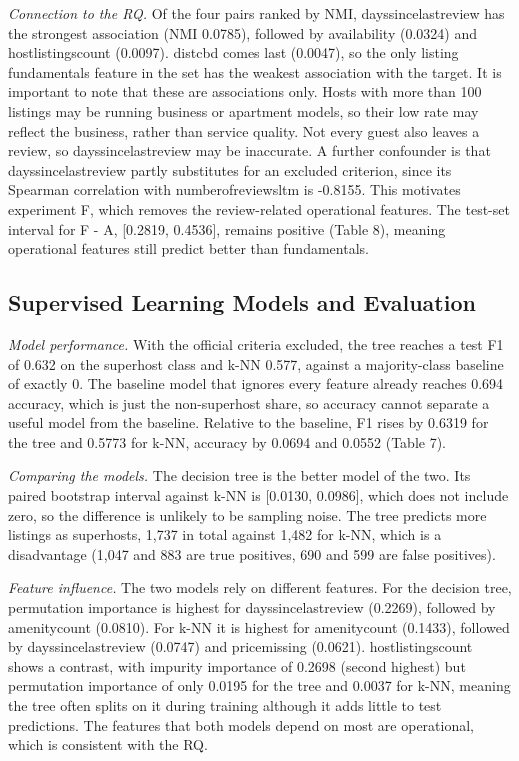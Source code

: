 \documentclass[final,1p,11pt]{elsarticle}
\renewcommand\_{\textunderscore\allowbreak}%
\begin{document}
\textit{Connection to the RQ.} Of the four pairs ranked by NMI, days\_since\_last\_review has the strongest association (NMI 0.0785), followed by availability\_365 (0.0324) and host\_listings\_count (0.0097). dist\_cbd comes last (0.0047), so the only listing fundamentals feature in the set has the weakest association with the target. It is important to note that these are associations only. Hosts with more than 100 listings may be running business or apartment models, so their low rate may reflect the business, rather than service quality. Not every guest also leaves a review, so days\_since\_last\_review may be inaccurate. A further confounder is that days\_since\_last\_review partly substitutes for an excluded criterion, since its Spearman correlation with number\_of\_reviews\_ltm is -0.8155. This motivates experiment F, which removes the review-related operational features. The test-set interval for F - A, [0.2819, 0.4536], remains positive (Table 8), meaning operational features still predict better than fundamentals.

\subsection{Supervised Learning Models and Evaluation}

\textit{Model performance.} With the official criteria excluded, the tree reaches a test F1 of 0.632 on the superhost class and k-NN 0.577, against a majority-class baseline of exactly 0. The baseline model that ignores every feature already reaches 0.694 accuracy, which is just the non-superhost share, so accuracy cannot separate a useful model from the baseline. Relative to the baseline, F1 rises by 0.6319 for the tree and 0.5773 for k-NN, accuracy by 0.0694 and 0.0552 (Table 7).

\textit{Comparing the models.} The decision tree is the better model of the two. Its paired bootstrap interval against k-NN is [0.0130, 0.0986], which does not include zero, so the difference is unlikely to be sampling noise. The tree predicts more listings as superhosts, 1,737 in total against 1,482 for k-NN, which is a disadvantage (1,047 and 883 are true positives, 690 and 599 are false positives).

\textit{Feature influence.} The two models rely on different features. For the decision tree, permutation importance is highest for days\_since\_last\_review (0.2269), followed by amenity\_count (0.0810). For k-NN it is highest for amenity\_count (0.1433), followed by days\_since\_last\_review (0.0747) and price\_missing (0.0621). host\_listings\_count shows a contrast, with impurity importance of 0.2698 (second highest) but permutation importance of only 0.0195 for the tree and 0.0037 for k-NN, meaning the tree often splits on it during training although it adds little to test predictions. The features that both models depend on most are operational, which is consistent with the RQ.
\end{document}
